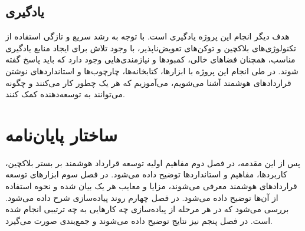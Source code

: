 \subsection{یادگیری}
هدف دیگر انجام این پروژه یادگیری است.
با توجه به رشد سریع و تازگی استفاده از تکنولوژی‌های بلاکچین و توکن‌های تعویض‌ناپذیر،
با وجود تلاش برای ایجاد منابع یادگیری مناسب، همچنان فضاهای خالی، کمبودها و نیازمندی‌هایی وجود دارد که باید پاسخ گفته شوند.
در طی انجام این پروژه با ابزارها، کتابخانه‌ها، چارچوب‌ها و استانداردهای نوشتن قراردادهای هوشمند آشنا می‌شویم،
می‌آموزیم که هر یک چطور کار می‌کنند و چگونه می‌توانند به توسعه‌دهنده کمک کنند.

\section{ساختار پایان‌نامه}
پس از این مقدمه، در فصل دوم مفاهیم اولیه توسعه قرارداد هوشمند بر بستر بلاکچین، کاربردها، مفاهیم و استاندارد‌ها توضیح داده می‌شود.
در فصل سوم ابزار‌های توسعه قرارداد‌های هوشمند معرفی می‌شوند،
مزایا و معایب هر یک بیان شده و نحوه استفاده از آن‌ها توضیح داده می‌شود.
در فصل چهارم روند پیاده‌سازی شرح داده می‌شود. بررسی می‌شود که در هر مرحله از پیاده‌سازی چه کارهایی به چه ترتیبی انجام شده است.
در فصل پنجم نیز نتایج توضیح داده می‌شوند و جمع‌بندی صورت می‌گیرد.
